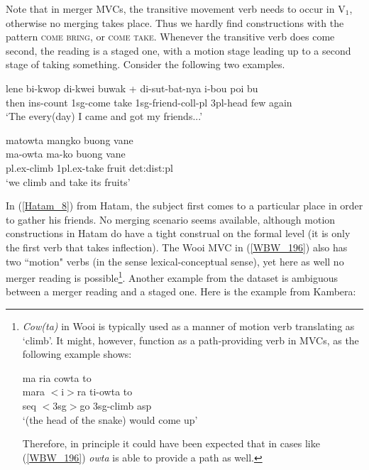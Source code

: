 Note that in merger MVCs, the transitive movement verb needs to occur in V$_1$, otherwise no merging takes place. Thus we hardly find constructions with the pattern \textsc{come} \textsc{bring}, or \textsc{come} \textsc{take}. Whenever the transitive verb does come second, the reading is a staged one, with a motion stage leading up to a second stage of taking something. Consider the following two examples.

\ea \label{Hatam_8}
\gll lene bi-kwop di-kwei buwak + di-sut-bat-nya i-bou poi bu \\
then \acs{ins}-count 1\acs{sg}-come take 1\acs{sg}-friend-\acs{coll}-\acs{pl} 3\acs{pl}-head few again \\
\glft `The every(day) I came and got my friends...' \ 
\z
\xe

\ea \label{WBW_196} 
\gll matowta mangko buong vane \\
ma-owta ma-ko buong vane \\
\acs{pl}.\acs{ex}-climb 1\acs{pl}.\acs{ex}-take fruit \acs{det}:\acs{dist}:\acs{pl}\\
\glft `we climb and take its fruits' \trailingcitation{{\small (betelnut\_story)}}\ 
\z
\xe

In (\ref{Hatam_8}) from Hatam, the subject first comes to a particular place in order to gather his friends. No merging scenario seems available, although motion constructions in Hatam do have a tight construal on the formal level (it is only the first verb that takes inflection). The Wooi MVC in (\ref{WBW_196}) also has two ``motion" verbs (in the sense lexical-conceptual sense), yet here as well no merger reading is possible\footnote{\textit{Cow(ta)} in Wooi is typically used as a manner of motion verb translating as `climb'. It might, however, function as a path-providing verb in MVCs, as the following example shows:

\ea 
\gll ma ria cowta to \\
mara $<$i$>$ra ti-owta to \\
\glc \acs{seq} $<$3\acs{sg}$>$go 3\acs{sg}-climb \acs{asp}\\
\glft `(the head of the snake) would come up' \ 
\z
\xe

Therefore, in principle it could have been expected that in cases like (\ref{WBW_196}) \textit{owta} is able to provide a path as well.}. Another example from the dataset is ambiguous between a merger reading and a staged one. Here is the example from Kambera:
 
